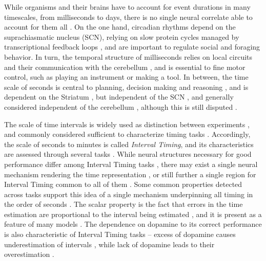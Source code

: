 While organisms and their brains have to account for event durations in many timescales, from milliseconds to days, there is no single neural correlate able to account for them all \cite{buhusi2005makes, buhusi2016clocks, hardy2016neurocomputational, lewis2003distinct, mauk2004neural}. On the one hand, circadian rhythms depend on the suprachiasmatic nucleus (SCN), relying on slow protein cycles managed by transcriptional feedback loops \cite{buhusi2005makes}, and are important to regulate social and foraging behavior. In turn, the temporal structure of milliseconds relies on local circuits and their communication with the cerebellum \cite{ohmae2017cerebellar}, and is essential to fine motor control, such as playing an instrument or making a tool. In between, the time scale of seconds is central to planning, decision making and reasoning \cite{buhusi2005makes}, and is dependent on the Striatum \cite{mello2015scalable}, but independent of the SCN \cite{lewis2003interval}, and generally considered independent of the cerebellum \cite{harrington2004does}, although this is still disputed \cite{ohmae2017cerebellar, nichelli1996perceptual}.

The scale of time intervals is widely used as distinction between experiments \cite{van20168, buhusi2005makes, hardy2016neurocomputational}, and commonly considered sufficient to characterize timing tasks \cite{buhusi2005makes}. Accordingly, the scale of seconds to minutes is called \textit{Interval Timing}, and its characteristics are assessed through several tasks \cite{lloyd2012neural,astrand2014comparison,brea2016prospective,mello2015scalable,gouvea2015striatal,kopec2018controlling,gershman2014dopamine,tiganj2016sequential,narayanan2009delay,cho2010differential}. While neural structures necessary for good performance differ among Interval Timing tasks \cite{paton2018neural}, there may exist a single neural mechanism rendering the time representation \cite{gibbon1977scalar}, or still further a single region for Interval Timing common to all of them \cite{mello2015scalable}. Some common properties detected across tasks support this idea of a single mechanism underpinning all timing in the order of seconds \cite{buhusi2005makes, gibbon1977scalar}. The scalar property is the fact that errors in the time estimation are  proportional to the interval being estimated \cite{oprisan2014all}, and it is present as a feature of many models \cite{gibbon1977scalar, oprisan2014all}. The dependence on dopamine to its correct performance is also characteristic of Interval Timing tasks \cite{kim2017optogenetic, meck2012gene} -- excess of dopamine causes underestimation of intervals \cite{cheng2016clock, pine2010dopamine}, while lack of dopamine leads to their overestimation \cite{drew2003effects}. 

